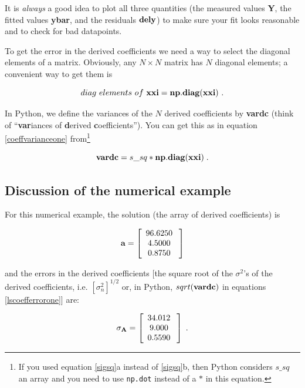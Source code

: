 \documentclass[psfig,preprint]{aastex}
\begin{document}
\noindent It is {\it always} a good idea to plot all three quantities
(the measured values {\bf Y}, the fitted values {\bf ybar}, and the
residuals ${\bf dely}$) to make sure your fit looks reasonable and to
check for bad datapoints. 

	To get the error in the derived coefficients we need a way to
select the diagonal elements of a matrix. Obviously, any $N \times N$
matrix has $N$ diagonal elements; a convenient way to get them is

\begin{equation}
diag \ elements \ of \ {\bf xxi}= {\bf np.diag(xxi)} \ .
\end{equation}

\noindent In Python, we define the variances of
the $N$ derived coefficients by {\bf vardc} (think of ``{\bf var}iances of
{\bf d}erived {\bf c}oefficients''). You can get this as in equation
\ref{coeffvarianceone} from\footnote{If you used equation \ref{sigsq}a
instead of \ref{sigsq}b, then Python considers $s\_ sq$ an array and you
need to use {\tt np.dot} instead of a $*$ in this equation.}

\begin{equation} \label{lscoefferrorone}
{\bf vardc} = s\_sq * {\bf np.diag(xxi)} \; .
\end{equation}

\subsection {Discussion of the numerical example}

	For this numerical example, the solution (the array of derived
coefficients) is

\begin{mathletters}
\label{avalues}
\begin{eqnarray}
{\bf a} = \left[
\begin{array}{c}
96.6250 \\
4.5000 \\
0.8750 \\
\end{array} \; \right] 
\end{eqnarray}

\noindent and the errors in the derived coefficients [the square root of
the $\sigma^2$'s of the derived coefficients, i.e.  $[\sigma_n^2]^{1/2}$
or, in Python, $sqrt({\bf vardc})$ in equations \ref{lscoefferrorone}] are:

\begin{eqnarray}
{\bf \sigma_A} = \left[
\begin{array}{c}
34.012 \\
9.000 \\
0.5590 \\
\end{array} \; \right] \; .
\end{eqnarray}
\end{mathletters}
\end{document}
